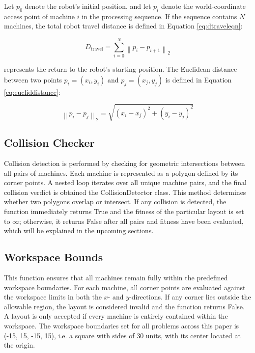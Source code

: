 \documentclass{article}
\begin{document}
Let $p_0$ denote the robot's initial position, and let $p_i$ denote the world-coordinate access point of machine $i$ in the processing sequence. If the sequence contains $N$ machines, the total robot travel distance is defined in Equation \ref{eq:dtraveleqn}:

\begin{equation}
D_{\text{travel}} =
\sum_{i=0}^{N}
\left\| p_i - p_{i+1} \right\|_2
\label{eq:dtraveleqn}
\end{equation}

represents the return to the robot's starting position. The Euclidean distance between two points $p_i = (x_i, y_i)$ and $p_j = (x_j, y_j)$ is defined in Equation \ref{eq:eucliddistance}:

\begin{equation}
\left\| p_i - p_j \right\|_2
=
\sqrt{(x_i - x_j)^2 + (y_i - y_j)^2}
\label{eq:eucliddistance}
\end{equation}

\subsection{Collision Checker}
Collision detection is performed by checking for geometric intersections between all pairs of machines. Each machine is represented as a polygon defined by its corner points. A nested loop iterates over all unique machine pairs, and the final collision verdict is obtained the CollisionDetector class. This method determines whether two polygons overlap or intersect. If any collision is detected, the function immediately returns True and the fitness of the particular layout is set to $\infty$; otherwise, it returns False after all pairs and fitness have been evaluated, which will be explained in the upcoming sections.

\subsection{Workspace Bounds}
This function ensures that all machines remain fully within the predefined workspace boundaries. For each machine, all corner points are evaluated against the workspace limits in both the \(x\)- and \(y\)-directions. If any corner lies outside the allowable region, the layout is considered invalid and the function returns False. A layout is only accepted if every machine is entirely contained within the workspace. The workspace boundaries set for all problems across this paper is (-15, 15, -15, 15), i.e. a square with sides of 30 units, with its center located at the origin.
\end{document}
